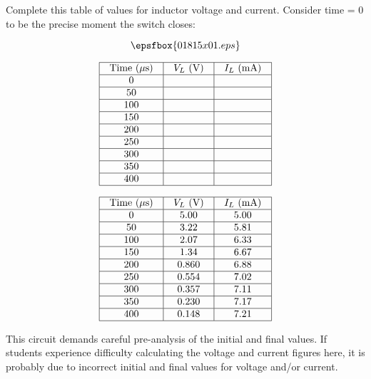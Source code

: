 

Complete this table of values for inductor voltage and current.  Consider time = 0 to be the precise moment the switch closes:

$$\epsfbox{01815x01.eps}$$


$$\vbox{\offinterlineskip
\halign{\strut
\vrule \quad\hfil # \ \hfil & 
\vrule \quad\hfil # \ \hfil & 
\vrule \quad\hfil # \ \hfil \vrule \cr
\noalign{\hrule}
%
Time ($\mu$s) & $V_L$ (V) & $I_L$ (mA) \cr
%
\noalign{\hrule}
%
0 &  &  \cr
%
\noalign{\hrule}
%
50 &  &  \cr
%
\noalign{\hrule}
%
100 &  &  \cr
%
\noalign{\hrule}
%
150 &  &  \cr
%
\noalign{\hrule}
%
200 &  &  \cr
%
\noalign{\hrule}
%
250 &  &  \cr
%
\noalign{\hrule}
%
300 &  &  \cr
%
\noalign{\hrule}
%
350 &  &  \cr
%
\noalign{\hrule}
%
400 &  &  \cr
%
\noalign{\hrule}
} %
}$$ %








$$\vbox{\offinterlineskip
\halign{\strut
\vrule \quad\hfil # \ \hfil & 
\vrule \quad\hfil # \ \hfil & 
\vrule \quad\hfil # \ \hfil \vrule \cr
\noalign{\hrule}
%
Time ($\mu$s) & $V_L$ (V) & $I_L$ (mA) \cr
%
\noalign{\hrule}
%
0 & 5.00 & 5.00 \cr
%
\noalign{\hrule}
%
50 & 3.22 & 5.81 \cr
%
\noalign{\hrule}
%
100 & 2.07 & 6.33 \cr
%
\noalign{\hrule}
%
150 & 1.34 & 6.67 \cr
%
\noalign{\hrule}
%
200 & 0.860 & 6.88 \cr
%
\noalign{\hrule}
%
250 & 0.554 & 7.02 \cr
%
\noalign{\hrule}
%
300 & 0.357 & 7.11 \cr
%
\noalign{\hrule}
%
350 & 0.230 & 7.17 \cr
%
\noalign{\hrule}
%
400 & 0.148 & 7.21 \cr
%
\noalign{\hrule}
} %
}$$ %








This circuit demands careful pre-analysis of the initial and final values.  If students experience difficulty calculating the voltage and current figures here, it is probably due to incorrect initial and final values for voltage and/or current.





